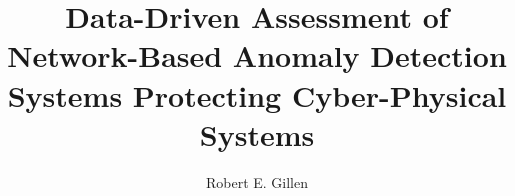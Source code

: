 \documentclass[11pt,oneside]{ttuthesis}
\title{Data-Driven Assessment of Network-Based Anomaly Detection Systems Protecting Cyber-Physical Systems}
\author{Robert E. Gillen}
\begin{document}

\begin{Spacing}{1}
\tableofcontents*  %
\listoftables      %
\listoffigures     %
\lstlistoflistings %
\renewcommand{\nomname}{LIST OF SYMBOLS}
\printnomenclature %
\end{Spacing}

\mainmatter
\end{document}
